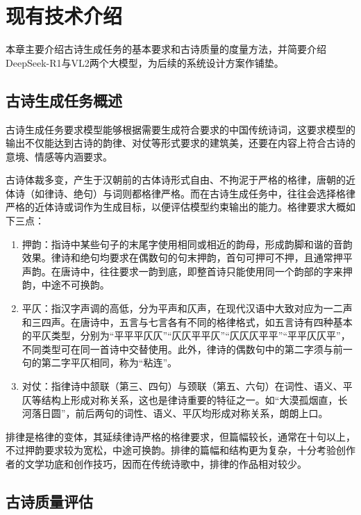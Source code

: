 
\chapter{现有技术介绍}

本章主要介绍古诗生成任务的基本要求和古诗质量的度量方法，并简要介绍DeepSeek-R1与VL2两个大模型，为后续的系统设计方案作铺垫。

\section{古诗生成任务概述}

古诗生成任务要求模型能够根据需要生成符合要求的中国传统诗词，这要求模型的输出不仅能达到古诗的韵律、对仗等形式要求的建筑美，还要在内容上符合古诗的意境、情感等内涵要求。

古诗体裁多变，产生于汉朝前的古体诗形式自由、不拘泥于严格的格律，唐朝的近体诗（如律诗、绝句）与词则都格律严格。而在古诗生成任务中，往往会选择格律严格的近体诗或词作为生成目标，以便评估模型约束输出的能力。格律要求大概如下三点：

\begin{enumerate}
    \item 押韵：指诗中某些句子的末尾字使用相同或相近的韵母，形成韵脚和谐的音韵效果。律诗和绝句均要求在偶数句的句末押韵，首句可押可不押，且通常押平声韵。在唐诗中，往往要求一韵到底，即整首诗只能使用同一个韵部的字来押韵，中途不可换韵。
    \item 平仄：指汉字声调的高低，分为平声和仄声，在现代汉语中大致对应为一二声和三四声。在唐诗中，五言与七言各有不同的格律格式，如五言诗有四种基本的平仄类型，分别为“平平平仄仄”“仄仄平平仄”“仄仄仄平平”“平平仄仄平”，不同类型可在同一首诗中交替使用。此外，律诗的偶数句中的第二字须与前一句的第二字平仄相同，称为“粘连”。
    \item 对仗：指律诗中颔联（第三、四句）与颈联（第五、六句）在词性、语义、平仄等结构上形成对称关系，这也是律诗重要的特征之一。如“大漠孤烟直，长河落日圆”，前后两句的词性、语义、平仄均形成对称关系，朗朗上口。
\end{enumerate}

排律是格律的变体，其延续律诗严格的格律要求，但篇幅较长，通常在十句以上，不过押韵要求较为宽松，中途可换韵。排律的篇幅和结构更为复杂，十分考验创作者的文学功底和创作技巧，因而在传统诗歌中，排律的作品相对较少。


\section{古诗质量评估}

